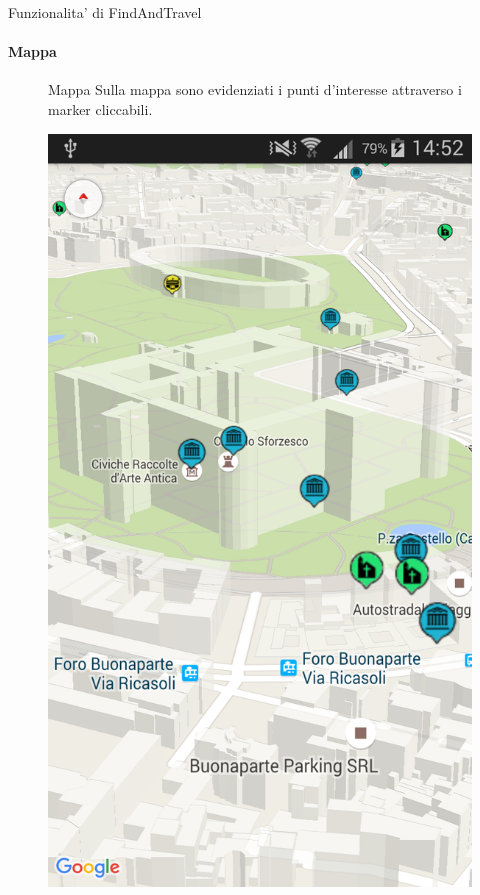 \documentclass[10pt,a4paper]{beamer}
\begin{document}
\begin{frame}{Funzionalita' di FindAndTravel}
\framesubtitle{Mappa}
\begin{figure}
\begin{minipage}{0.45\textwidth}
 \begin{block}{Mappa}
  Sulla mappa sono evidenziati i punti d'interesse attraverso i marker cliccabili.
 \end{block}
\end{minipage}
\hfill
\begin{minipage}{0.35\textwidth}
  \includegraphics[scale=0.1]{mappa2.png}
\end{minipage}
\end{figure}

\end{frame}
\end{document}
